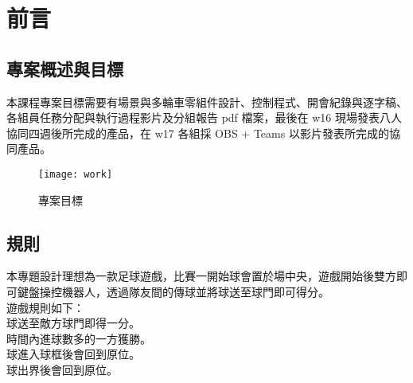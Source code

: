 \chapter{前言}
\renewcommand{\baselinestretch}{10.0} %
\setcounter{page}{1}  %
\fontsize{14pt}{2.5pt}\sectionef
\section{專案概述與目標}
本課程專案目標需要有場景與多輪車零組件設計、控制程式、開會紀錄與逐字稿、各組員任務分配與執行過程影片及分組報告 pdf 檔案，最後在 w16 現場發表八人協同四週後所完成的產品，在 w17 各組採 OBS + Teams 以影片發表所完成的協同產品。
\begin{figure}[hbt!]
\begin{center}
\texttt{[image: work]}
\caption{\Large 專案目標}\label{專案目標}
\end{center}
\end{figure} 
\section{規則}
本專題設計理想為一款足球遊戲，比賽一開始球會置於場中央，遊戲開始後雙方即
可鍵盤操控機器人，透過隊友間的傳球並將球送至球門即可得分。\\
遊戲規則如下：\\
球送至敵方球門即得一分。\\
時間內進球數多的一方獲勝。\\
球進入球框後會回到原位。\\
球出界後會回到原位。\\
\renewcommand{\baselinestretch}{0.5} %
